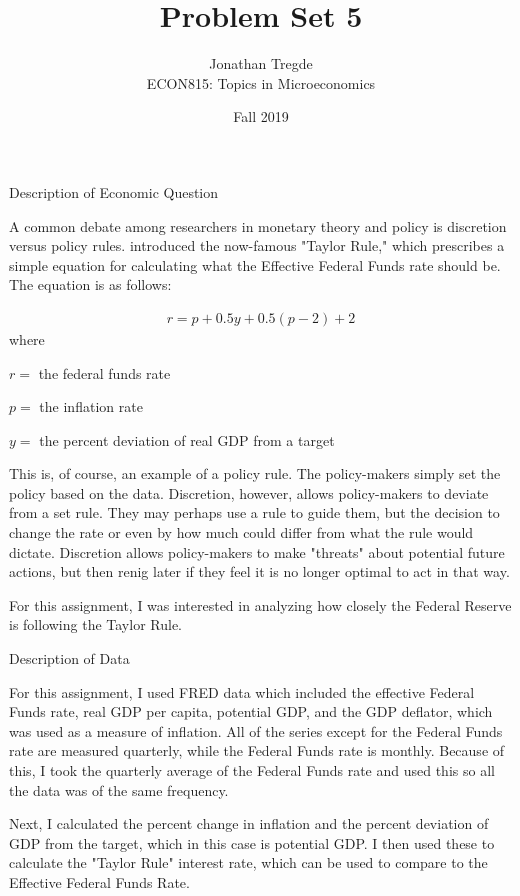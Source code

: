 \documentclass[12pt]{article}
\newenvironment{question}[2][Question]{\begin{trivlist}
\item[\hskip \labelsep {\bfseries #1}\hskip \labelsep {\bfseries #2.}]}{\end{trivlist}}
\begin{document}

\title{Problem Set 5}
\author{Jonathan Tregde\\
ECON815: Topics in Microeconomics}
\date{Fall 2019}
\maketitle
\begin{question}{1} Description of Economic Question

A common debate among researchers in monetary theory and policy is discretion versus policy rules. \cite{Taylor1993} introduced the now-famous "Taylor Rule," which prescribes a simple equation for calculating what the Effective Federal Funds rate should be. The equation is as follows:

\begin{align} 
r = p + 0.5y + 0.5(p-2) +2
\end{align}
where

$r =$ the federal funds rate

$p =$ the inflation rate

$y =$ the percent deviation of real GDP from a target
\vspace{5mm}

This is, of course, an example of a policy rule. The policy-makers simply set the policy based on the data. Discretion, however, allows policy-makers to deviate from a set rule. They may perhaps use a rule to guide them, but the decision to change the rate or even by how much could differ from what the rule would dictate. Discretion allows policy-makers to make "threats" about potential future actions, but then renig later if they feel it is no longer optimal to act in that way.

For this assignment, I was interested in analyzing how closely the Federal Reserve is following the Taylor Rule.

\end{question}

\begin{question}{2} Description of Data

For this assignment, I used FRED data which included the effective Federal Funds rate, real GDP per capita, potential GDP, and the GDP deflator, which was used as a measure of inflation. All of the series except for the Federal Funds rate are measured quarterly, while the Federal Funds rate is monthly. Because of this, I took the quarterly average of the Federal Funds rate and used this so all the data was of the same frequency.

Next, I calculated the percent change in inflation and the percent deviation of GDP from the target, which in this case is potential GDP. I then used these to calculate the "Taylor Rule" interest rate, which can be used to compare to the Effective Federal Funds Rate.


\end{question}
\newpage
\end{document}
